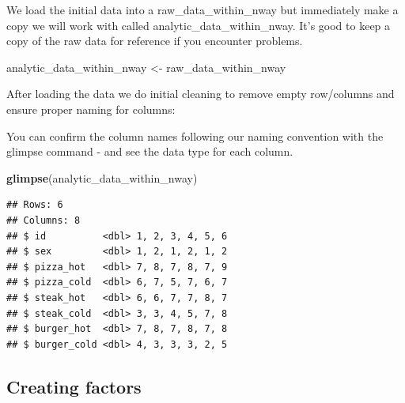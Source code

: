 \documentclass[
]{krantz}
\makeatletter
\newenvironment{Shaded}{\begin{snugshade}}{\end{snugshade}}
\newcommand{\CommentTok}[1]{\textcolor[rgb]{0.37,0.37,0.37}{\textit{#1}}}
\newcommand{\KeywordTok}[1]{\textcolor[rgb]{0.27,0.27,0.27}{\textbf{#1}}}
\newcommand{\NormalTok}[1]{#1}
\newcommand{\OperatorTok}[1]{\textcolor[rgb]{0.43,0.43,0.43}{\textbf{#1}}}
\newcommand{\StringTok}[1]{\textcolor[rgb]{0.5,0.5,0.5}{#1}}
\newenvironment{kframe}{%
\medskip{}
\setlength{\fboxsep}{.8em}
 \def\at@end@of@kframe{}%
 \ifinner\ifhmode%
  \def\at@end@of@kframe{\end{minipage}}%
  \begin{minipage}{\columnwidth}%
 \fi\fi%
 \def\FrameCommand##1{\hskip\@totalleftmargin \hskip-\fboxsep
 \colorbox{shadecolor}{##1}\hskip-\fboxsep
     \hskip-\linewidth \hskip-\@totalleftmargin \hskip\columnwidth}%
 \MakeFramed {\advance\hsize-\width
   \@totalleftmargin\z@ \linewidth\hsize
   \@setminipage}}%
 {\par\unskip\endMakeFramed%
 \at@end@of@kframe}
\renewenvironment{Shaded}{\begin{kframe}}{\end{kframe}}
\makeatother
\begin{document}
We load the initial data into a raw\_data\_within\_nway but immediately make a copy we will work with called analytic\_data\_within\_nway. It's good to keep a copy of the raw data for reference if you encounter problems.

\begin{Shaded}
\begin{Highlighting}[]
\NormalTok{analytic_data_within_nway <-}\StringTok{ }\NormalTok{raw_data_within_nway}
\end{Highlighting}
\end{Shaded}

After loading the data we do initial cleaning to remove empty row/columns and ensure proper naming for columns:

\begin{Shaded}
\end{Shaded}

You can confirm the column names following our naming convention with the glimpse command - and see the data type for each column.

\begin{Shaded}
\begin{Highlighting}[]
\KeywordTok{glimpse}\NormalTok{(analytic_data_within_nway)}
\end{Highlighting}
\end{Shaded}

\begin{verbatim}
## Rows: 6
## Columns: 8
## $ id          <dbl> 1, 2, 3, 4, 5, 6
## $ sex         <dbl> 1, 2, 1, 2, 1, 2
## $ pizza_hot   <dbl> 7, 8, 7, 8, 7, 9
## $ pizza_cold  <dbl> 6, 7, 5, 7, 6, 7
## $ steak_hot   <dbl> 6, 6, 7, 7, 8, 7
## $ steak_cold  <dbl> 3, 3, 4, 5, 7, 8
## $ burger_hot  <dbl> 7, 8, 7, 8, 7, 8
## $ burger_cold <dbl> 4, 3, 3, 3, 2, 5
\end{verbatim}

\hypertarget{creating-factors-2}{%
\subsection{Creating factors}\label{creating-factors-2}}
\end{document}
